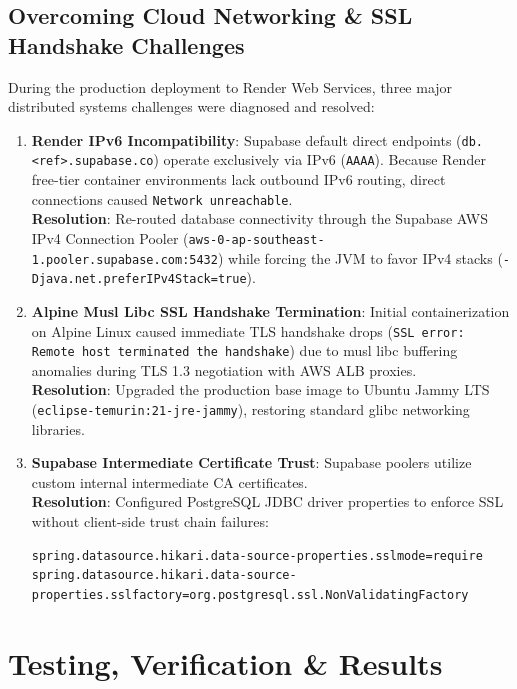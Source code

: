 \documentclass[12pt,a4paper,oneside]{report}
\begin{document}
\section{Overcoming Cloud Networking \& SSL Handshake Challenges}
During the production deployment to Render Web Services, three major distributed systems challenges were diagnosed and resolved:
\begin{enumerate}
    \item \textbf{Render IPv6 Incompatibility}: Supabase default direct endpoints (\texttt{db.<ref>.supabase.co}) operate exclusively via IPv6 (\texttt{AAAA}). Because Render free-tier container environments lack outbound IPv6 routing, direct connections caused \texttt{Network unreachable}. \\
    \textbf{Resolution}: Re-routed database connectivity through the Supabase AWS IPv4 Connection Pooler (\texttt{aws-0-ap-southeast-1.pooler.supabase.com:5432}) while forcing the JVM to favor IPv4 stacks (\texttt{-Djava.net.preferIPv4Stack=true}).
    \item \textbf{Alpine Musl Libc SSL Handshake Termination}: Initial containerization on Alpine Linux caused immediate TLS handshake drops (\texttt{SSL error: Remote host terminated the handshake}) due to musl libc buffering anomalies during TLS 1.3 negotiation with AWS ALB proxies. \\
    \textbf{Resolution}: Upgraded the production base image to Ubuntu Jammy LTS (\texttt{eclipse-temurin:21-jre-jammy}), restoring standard glibc networking libraries.
    \item \textbf{Supabase Intermediate Certificate Trust}: Supabase poolers utilize custom internal intermediate CA certificates. \\
    \textbf{Resolution}: Configured PostgreSQL JDBC driver properties to enforce SSL without client-side trust chain failures:
    \begin{lstlisting}[language=properties]
spring.datasource.hikari.data-source-properties.sslmode=require
spring.datasource.hikari.data-source-properties.sslfactory=org.postgresql.ssl.NonValidatingFactory
    \end{lstlisting}
\end{enumerate}

\newpage
\chapter{Testing, Verification \& Results}
\end{document}
